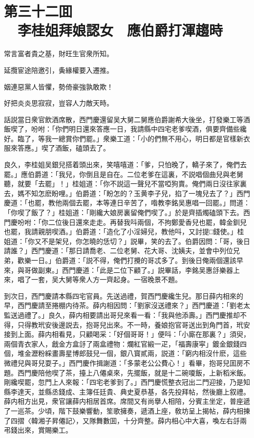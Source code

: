 
\chapter*{第三十二囬\\　李桂姐拜娘認女　應伯爵打渾趨時}
\thispagestyle{empty}

\begin{myquote}
常言富者貴之基，財旺生官衆所知。

延攬宦途陪邀引，夤緣權要入遷推。

姻連惡黨人皆懼，勢倚豪強孰敢欺！

好把炎炎思寂寂，豈容人力敵天時。
\end{myquote}

話説當日衆官飲酒席散，西門慶還留吴大舅二舅應伯爵謝希大後坐，打發樂工等酒飯喫了，吩咐：「你們明日還來答應一日，我請縣中四宅老爹喫酒，俱要齊備些纔好。臨了，等我一總賞你們罷。」衆樂工道：「小的們無不用心，明日都是官樣新衣服來答應。」喫了酒飯，磕頭去了。

良久，李桂姐吴銀兒搭着頭出來，笑嘻嘻道：「爹，只怕晚了，轎子來了，俺們去罷。」應伯爵道：「我兒，你倒且是自在。二位老爹在這裏，不説唱個曲兒與老舅聽，就要「去罷」！」桂姐道：「你不説這一聲兒不當啞狗賣。俺們兩日沒往家裏去，媽不知怎麽盼哩。」伯爵道：「盼怎的？玉黄李子兒，掐了一塊兒去了？」西門慶道：「也罷，教他兩個去罷，本等連日辛苦了，喒教李銘吴惠唱一回罷。」問道：「你喫了飯了？」桂姐道：「剛纔大娘房裏留俺們喫了。」於是齊插燭磕頭下去。西門慶吩咐：「你二位後日還來走走。再替我呌兩個，不拘鄭愛香兒也罷，韓金釧兒也罷，我請親朋喫酒。」伯爵道：「造化了小淫婦兒，教他呌，又討提□錢使。」桂姐道：「你又不是架兒，你怎曉的恁切？」説畢，笑的去了。伯爵因問：「哥，後日請誰？」西門慶道：「那日請喬老、二位老舅、花大哥、沈姨夫，並會中列位兄弟，歡樂一日。」伯爵道：「説不得，俺們打攪的哥忒多了。到後日俺兩個還該早來，與哥做副東。」西門慶道：「此是二位下顧了。」説畢話，李銘吴惠㧱樂器上來，唱了一套，吴大舅等衆人方一齊起身。一宿晚景不題。

到次日，西門慶請本縣四宅官員。先送過禮，賀西門慶纔生兒。那日薛内相來的早，西門慶請至捲棚内待茶。薛内相因問：「劉家沒送禮來？」西門慶道：「劉老太監送過禮了。」良久，薛内相要請出哥兒來看一看：「我與他添壽。」西門慶推却不得，只得教玳安後邊説去，抱哥兒出來。不一時，養娘抱官哥送出到角門首，玳安接到上面。薛内相看見，只顧喝采：「好個哥哥！」便呌：「小廝在那裏？」須臾，兩個青衣家人，戧金方盒㧱了兩盒禮物：爛紅官緞一疋，「福壽康寜」鍍金銀錢四個，堆金瀝粉綵畫壽星博郎鼓兒一個，銀八寳貳兩，説道：「窮内相沒什麽，這些微禮兒與哥兒耍子。」西門慶作揖謝道：「多蒙老公公費心！」看畢，抱哥兒囬房不題。西門慶陪他喫了茶，擡上八僊桌來，先擺飯，就是十二碗嗄飯，上新稻米飯。剛纔喫罷，忽門上人來報：「四宅老爹到了。」西門慶慌整衣冠出二門迎接，乃是知縣李達天，並縣丞錢成、主簿任廷貴、典史夏恭基，各先投拜帖，然後廳上叙禮。薛内相方出見，衆官讓薛内相居首席。席間又有尚擧人相陪，分賓主坐定，普座遞了一巡茶。少頃，階下鼓樂響動，笙歌擁奏，遞酒上座，敎坊呈上揭帖，薛内相揀了四摺〈韓湘子昇僊記〉，又隊舞數囬，十分齊整。薛内相心中大喜，喚左右㧱兩弔錢出來，賞賜樂工。


